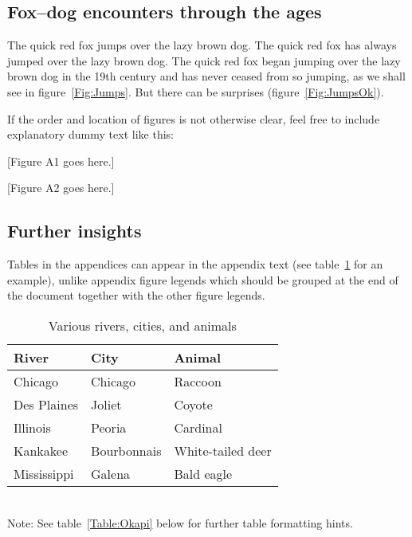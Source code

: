 \documentclass[11pt]{article}
\begin{document}
\renewcommand{\theequation}{A\arabic{equation}}
\renewcommand{\thetable}{A\arabic{table}}
\setcounter{equation}{0}  %
\setcounter{figure}{0}
\setcounter{table}{0}

\subsection*{Fox--dog encounters through the ages}

The quick red fox jumps over the lazy brown dog. The quick red fox has always jumped over the lazy brown dog. The quick red fox began jumping over the lazy brown dog in the 19th century and has never ceased from so jumping, as we shall see in figure~\ref{Fig:Jumps}. But there can be surprises (figure~\ref{Fig:JumpsOk}).

If the order and location of figures is not otherwise clear, feel free to include explanatory dummy text like this:

[Figure A1 goes here.]

[Figure A2 goes here.]

\subsection*{Further insights}

Tables in the appendices can appear in the appendix text (see table~\ref{Table:Rivers} for an example), unlike appendix figure legends which should be grouped at the end of the document together with the other figure legends.

\begin{table}[h]
\caption{Various rivers, cities, and animals}
\label{Table:Rivers}
\centering
\begin{tabular}{lll}\hline
River        & City        & Animal            \\ \hline
Chicago      & Chicago     & Raccoon           \\
Des Plaines  & Joliet      & Coyote            \\
Illinois     & Peoria      & Cardinal          \\
Kankakee     & Bourbonnais & White-tailed deer \\
Mississippi  & Galena      & Bald eagle        \\ \hline
\end{tabular}
\bigskip{}
\\
{\footnotesize Note: See table~\ref{Table:Okapi} below for further table formatting hints.}
\end{table}
\end{document}
